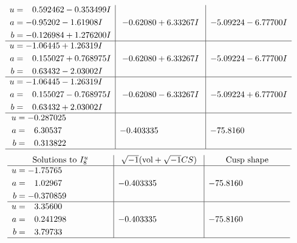 \documentclass[1p]{elsarticle_modified}
\theoremstyle{definition}
\newcommand{\I}{\sqrt{-1}}
\begin{document}
$$\begin{array}{c|c|c}
\begin{aligned}
u &= \phantom{-}0.592462 - 0.353499 I \\
a &= -0.95202 - 1.61908 I \\
b &= -0.126984 + 1.276200 I\end{aligned}
 & -0.62080 + 6.33267 I & -5.09224 - 6.77700 I \\ \hline\begin{aligned}
u &= -1.06445 + 1.26319 I \\
a &= \phantom{-}0.155027 + 0.768975 I \\
b &= \phantom{-}0.63432 - 2.03002 I\end{aligned}
 & -0.62080 + 6.33267 I & -5.09224 - 6.77700 I \\ \hline\begin{aligned}
u &= -1.06445 - 1.26319 I \\
a &= \phantom{-}0.155027 - 0.768975 I \\
b &= \phantom{-}0.63432 + 2.03002 I\end{aligned}
 & -0.62080 - 6.33267 I & -5.09224 + 6.77700 I \\ \hline\begin{aligned}
u &= -0.287025\phantom{ +0.000000I} \\
a &= \phantom{-}6.30537\phantom{ +0.000000I} \\
b &= \phantom{-}0.313822\phantom{ +0.000000I}\end{aligned}
 & -0.403335\phantom{ +0.000000I} & -75.8160\phantom{ +0.000000I}\\
 \hline 
 \end{array}$$\newpage$$\begin{array}{c|c|c}  
\text{Solutions to }I^u_{8}& \I (\text{vol} + \sqrt{-1}CS) & \text{Cusp shape}\\
 \hline 
\begin{aligned}
u &= -1.75765\phantom{ +0.000000I} \\
a &= \phantom{-}1.02967\phantom{ +0.000000I} \\
b &= -0.370859\phantom{ +0.000000I}\end{aligned}
 & -0.403335\phantom{ +0.000000I} & -75.8160\phantom{ +0.000000I} \\ \hline\begin{aligned}
u &= \phantom{-}3.35600\phantom{ +0.000000I} \\
a &= \phantom{-}0.241298\phantom{ +0.000000I} \\
b &= \phantom{-}3.79733\phantom{ +0.000000I}\end{aligned}
 & -0.403335\phantom{ +0.000000I} & -75.8160\phantom{ +0.000000I}\\
 \hline 
 \end{array}$$\newpage\newpage\renewcommand{\arraystretch}{1}
\end{document}
